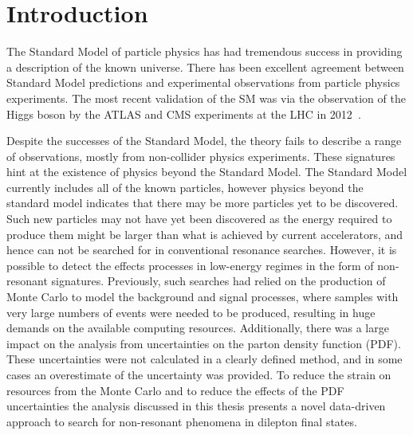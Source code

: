\chapter{Introduction}\label{chap:intro}

The Standard Model of particle physics has had tremendous success in providing a description of the known universe. There has been excellent agreement between Standard Model predictions and experimental observations from particle physics experiments. The most recent validation of the SM was via the observation of the Higgs boson by the ATLAS and CMS experiments at the LHC in 2012~\cite{Chatrchyan2012,Aad_2012}.

Despite the successes of the Standard Model, the theory fails to describe a range of observations, mostly from non-collider physics experiments. These signatures hint at the existence of physics beyond the Standard Model. The Standard Model currently includes all of the known particles, however physics beyond the standard model indicates that there may be more particles yet to be discovered. Such new particles may not have yet been discovered as the energy required to produce them might be larger than what is achieved by current accelerators, and hence can not be searched for in conventional resonance searches. However, it is possible to detect the effects processes in low-energy regimes in the form of non-resonant signatures. Previously, such searches had relied on the production of Monte Carlo to model the background and signal processes, where samples with very large numbers of events were needed to be produced, resulting in huge demands on the available computing resources. Additionally, there was a large impact on the analysis from uncertainties on the parton density function (PDF). These uncertainties were not calculated in a clearly defined method, and in some cases an overestimate of the uncertainty was provided. To reduce the strain on resources from the Monte Carlo and to reduce the effects of the PDF uncertainties the analysis discussed in this thesis presents a novel data-driven approach to search for non-resonant phenomena in dilepton final states. 


